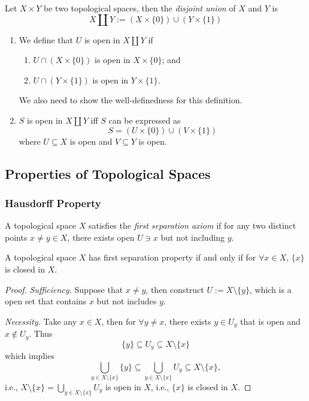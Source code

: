 \begin{definition}
Let $X\times Y$ be two topological spaces, then the \emph{disjoint union} of $X$ and $Y$ is
\[
X\coprod Y:=(X\times\{0\})\cup(Y\times\{1\})
\]
\end{definition}
\begin{remark}
\begin{enumerate}
\item
We define that $U$ is open in $X\coprod Y$ if
\begin{enumerate}
\item
$U\cap(X\times\{0\})$ is open in $X\times\{0\}$; and
\item
$U\cap(Y\times\{1\})$ is open in $Y\times\{1\}$.
\end{enumerate}
We also need to show the well-definedness for this definition.
\item
$S$ is open in $X\coprod Y$ iff $S$ can be expressed as
\[
S=(U\times\{0\})\cup(V\times\{1\})
\]
where $U\subseteq X$ is open and $V\subseteq Y$ is open.
\end{enumerate}
\end{remark}


\subsection{Properties of Topological Spaces}
\subsubsection{Hausdorff Property}
\begin{definition}
A topological space $X$ satisfies the \emph{first separation axiom} if for any two distinct points $x\ne y\in X$, there exists open $U\ni x$ but not including $y$.
\end{definition}

\begin{proposition}
A topological space $X$ has first separation property if and only if for $\forall x\in X$, $\{x\}$ is closed in $X$.
\end{proposition}
\begin{proof}
\textit{Sufficiency.}
Suppose that $x\ne y$, then construct $U:=X\setminus\{y\}$, which is a open set that contains $x$ but not includes $y$.

\textit{Necessity.}
Take any $x\in X$, then for $\forall y\ne x$, there exists $y\in U_y$ that is open and $x\notin U_y$. Thus 
\[
\{y\}\subseteq U_y\subseteq X\setminus\{x\}
\]
which implies
\[
\bigcup_{y\in X\setminus\{x\}}\{y\}\subseteq
\bigcup_{y\in X\setminus\{x\}}U_y\subseteq
X\setminus\{x\},
\]
i.e., $X\setminus\{x\}=\bigcup_{y\in X\setminus\{x\}}U_y$ is open in $X$, i.e., $\{x\}$ is closed in $X.$
\end{proof}

